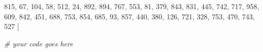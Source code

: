 \documentclass[11pt]{article}
\newenvironment{Shaded}{}{}
\newcommand{\DecValTok}[1]{\textcolor[rgb]{0.25,0.63,0.44}{{#1}}}
\newcommand{\CommentTok}[1]{\textcolor[rgb]{0.38,0.63,0.69}{\textit{{#1}}}}
\newcommand{\NormalTok}[1]{{#1}}
\begin{document}
\begin{Shaded}
\begin{Highlighting}[]
    \DecValTok{815}\NormalTok{, }\DecValTok{67}\NormalTok{, }\DecValTok{104}\NormalTok{, }\DecValTok{58}\NormalTok{, }\DecValTok{512}\NormalTok{, }\DecValTok{24}\NormalTok{, }\DecValTok{892}\NormalTok{, }\DecValTok{894}\NormalTok{, }\DecValTok{767}\NormalTok{, }\DecValTok{553}\NormalTok{, }\DecValTok{81}\NormalTok{, }\DecValTok{379}\NormalTok{, }\DecValTok{843}\NormalTok{, }\DecValTok{831}\NormalTok{, }\DecValTok{445}\NormalTok{, }\DecValTok{742}\NormalTok{, }\DecValTok{717}\NormalTok{,}
    \DecValTok{958}\NormalTok{, }\DecValTok{609}\NormalTok{, }\DecValTok{842}\NormalTok{, }\DecValTok{451}\NormalTok{, }\DecValTok{688}\NormalTok{, }\DecValTok{753}\NormalTok{, }\DecValTok{854}\NormalTok{, }\DecValTok{685}\NormalTok{, }\DecValTok{93}\NormalTok{, }\DecValTok{857}\NormalTok{, }\DecValTok{440}\NormalTok{, }\DecValTok{380}\NormalTok{, }\DecValTok{126}\NormalTok{, }\DecValTok{721}\NormalTok{, }\DecValTok{328}\NormalTok{, }\DecValTok{753}\NormalTok{, }\DecValTok{470}\NormalTok{,}
    \DecValTok{743}\NormalTok{, }\DecValTok{527}
\NormalTok{]}

\CommentTok{# your code goes here}
\end{Highlighting}
\end{Shaded}
\end{document}
